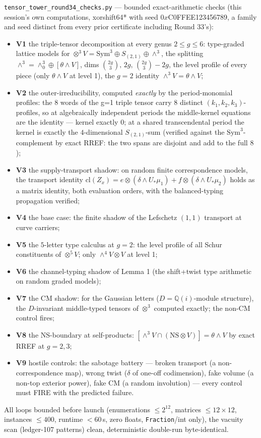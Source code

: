 \documentclass[11pt]{article}
\newcommand{\Q}{\mathbb{Q}}
\newcommand{\NS}{\mathrm{NS}}
\begin{document}
\texttt{tensor\_tower\_round34\_checks.py} --- bounded exact-arithmetic
checks (this session's own computations, xorshift64* with seed
$0x$C0FFEE123456789, a family and seed distinct from every prior
certificate including Round 33's):
\begin{itemize}
\item \textbf{V1} the triple-tensor decomposition at every genus
$2\le g\le6$: type-graded lattice models for
$\otimes^3V=\mathrm{Sym}^3\oplus S_{(2,1)}\oplus\wedge^3$, the splitting
$\wedge^3=\wedge^3_0\oplus[\theta\wedge V]$, dims
$\binom{2g}{3},\,2g,\,\binom{2g}{3}-2g$, the level profile of every
piece (only $\theta\wedge V$ at level 1), the $g=2$ identity
$\wedge^3V=\theta\wedge V$;
\item \textbf{V2} the outer-irreducibility, computed \emph{exactly} by the
period-monomial profiles: the 8 words of the g=1 triple tensor carry 8
distinct $(k_1,k_2,k_3)$-profiles, so at algebraically independent
periods the middle-kernel equations are the identity --- kernel exactly
$0$; at a shared transcendental period the kernel is exactly the
$4$-dimensional $S_{(2,1)}$-sum (verified against the
$\mathrm{Sym}^3$-complement by exact RREF: the two spans are disjoint
and add to the full $8$);
\item \textbf{V3} the supply-transport shadow: on random finite
correspondence models, the transport identity
$\mathrm{cl}(Z_x)=e\otimes(\delta\wedge U_*\mu_1)+f\otimes
(\delta\wedge U_*\mu_2)$ holds as a matrix identity, both evaluation
orders, with the balanced-typing propagation verified;
\item \textbf{V4} the base case: the finite shadow of the Lefschetz
$(1,1)$ transport at curve carriers;
\item \textbf{V5} the $5$-letter type calculus at $g=2$: the level
profile of all Schur constituents of $\otimes^5V$; only
$\wedge^4V\otimes V$ at level 1;
\item \textbf{V6} the channel-typing shadow of Lemma 1 (the shift+twist
type arithmetic on random graded models);
\item \textbf{V7} the CM shadow: for the Gaussian letters
($D=\Q(i)$-module structure), the $D$-invariant middle-typed tensors of
$\otimes^3$ computed exactly; the non-CM control fires;
\item \textbf{V8} the NS-boundary at self-products:
$[\wedge^3V\cap(\NS\otimes V)]=\theta\wedge V$ by exact RREF at
$g=2,3$;
\item \textbf{V9} hostile controls: the sabotage battery --- broken
transport (a non-correspondence map), wrong twist ($\delta$ of one-off
codimension), fake volume (a non-top exterior power), fake CM (a random
involution) --- every control must FIRE with the predicted failure.
\end{itemize}
All loops bounded before launch (enumerations $\le2^{12}$, matrices
$\le12\times12$, instances $\le400$, runtime $<60$\,s, zero floats,
\texttt{Fraction}/int only), the vacuity scan (ledger-107 patterns)
clean, deterministic double-run byte-identical.
\end{document}
